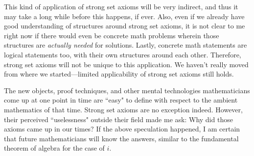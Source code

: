 \documentclass{article}
\theoremstyle{plain}
\begin{document}
This kind of application of strong set axioms will be very indirect, and thus it may take a long while before this happens, if ever. Also, even if we already have good understanding of structures around strong set axioms, it is not clear to me right now if there would even be concrete math problems wherein those structures are \textit{actually needed} for solutions. Lastly, concrete math statements are logical statements too, with their own structures around each other. Therefore, strong set axioms will not be unique to this application. We haven't really moved from where we started---limited applicability of strong set axioms still holds.

The new objects, proof techniques, and other mental technologies mathematicians come up at one point in time are ``easy" to define with respect to the ambient mathematics of that time. Strong set axioms are no exception indeed. However, their perceived ``uselessness" outside their field made me ask: Why did those axioms came up in our times? If the above speculation happened, I am certain that future mathematicians will know the answers, similar to the fundamental theorem of algebra for the case of $i$.



\end{document}
